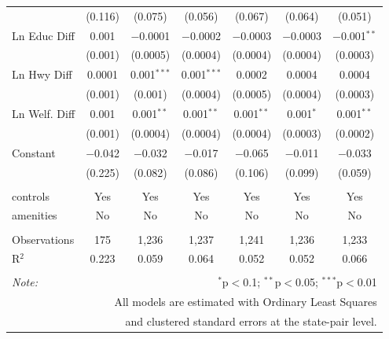 \begin{table}[!htbp]
\begin{tabular}{@{\extracolsep{5pt}}lcccccc}
  & (0.116) & (0.075) & (0.056) & (0.067) & (0.064) & (0.051) \\ 
  Ln Educ Diff & 0.001 & $-$0.0001 & $-$0.0002 & $-$0.0003 & $-$0.0003 & $-$0.001$^{**}$ \\ 
  & (0.001) & (0.0005) & (0.0004) & (0.0004) & (0.0004) & (0.0003) \\ 
  Ln Hwy Diff & 0.0001 & 0.001$^{***}$ & 0.001$^{***}$ & 0.0002 & 0.0004 & 0.0004 \\ 
  & (0.001) & (0.001) & (0.0004) & (0.0005) & (0.0004) & (0.0003) \\ 
  Ln Welf. Diff & 0.001 & 0.001$^{**}$ & 0.001$^{**}$ & 0.001$^{**}$ & 0.001$^{*}$ & 0.001$^{**}$ \\ 
  & (0.001) & (0.0004) & (0.0004) & (0.0004) & (0.0003) & (0.0002) \\ 
  Constant & $-$0.042 & $-$0.032 & $-$0.017 & $-$0.065 & $-$0.011 & $-$0.033 \\ 
  & (0.225) & (0.082) & (0.086) & (0.106) & (0.099) & (0.059) \\ 
 \hline \\[-1.8ex] 
controls & Yes & Yes & Yes & Yes & Yes & Yes \\ 
amenities & No & No & No & No & No & No \\ 
\hline \\[-1.8ex] 
Observations & 175 & 1,236 & 1,237 & 1,241 & 1,236 & 1,233 \\ 
R$^{2}$ & 0.223 & 0.059 & 0.064 & 0.052 & 0.052 & 0.066 \\ 
\hline 
\hline \\[-1.8ex] 
\textit{Note:}  & \multicolumn{6}{r}{$^{*}$p$<$0.1; $^{**}$p$<$0.05; $^{***}$p$<$0.01} \\ 
 & \multicolumn{6}{r}{All models are estimated with Ordinary Least Squares} \\ 
 & \multicolumn{6}{r}{and clustered standard errors at the state-pair level.} \\ 
\end{tabular} 
\end{table} 
